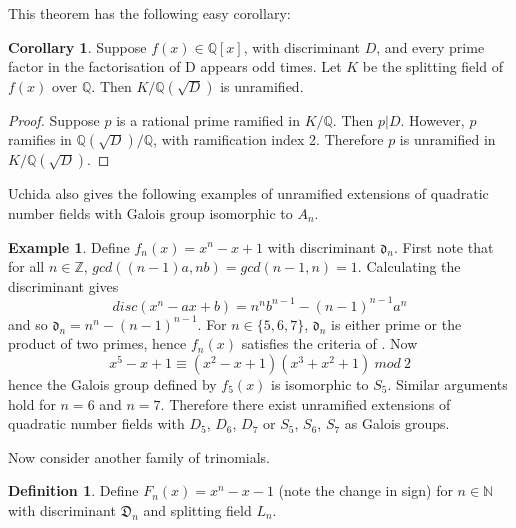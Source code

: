 \documentclass[12pt]{extarticle}
\newcommand{\N}{\mathbb{N}}
\newcommand{\Q}{\mathbb{Q}}
\newcommand{\Z}{\mathbb{Z}}
\newcommand{\<}{\langle}
\renewcommand{\>}{\rangle}
\theoremstyle{definition}
\newtheorem{corollary}{Corollary}
\newtheorem*{definition}{Definition}
\newtheorem{example}{Example}
\begin{document}
This theorem has the following easy corollary:
\begin{corollary}
Suppose $f(x) \in \Q[x]$, with discriminant $D$, and every prime factor in the factorisation of D appears odd times. Let $K$ be the splitting field of $f(x)$ over $\Q$. Then $K/\Q\left(\sqrt{D}\right)$ is unramified. \label{cor:uchida}
\end{corollary}
\begin{proof}
Suppose $p$ is a rational prime ramified in $K/\Q$. Then $p|D$. However, $p$ ramifies in $\Q(\sqrt{D})/\Q$, with ramification index 2. Therefore $p$ is unramified in $K/\Q(\sqrt{D})$. 
\end{proof}
Uchida also gives the following examples of unramified extensions of quadratic number fields with Galois group isomorphic to $A_n$.\par
\begin{example}
Define $f_n(x) = x^n-x+1$ with discriminant $\mathfrak{d}_n$. First note that for all $n \in \Z$, 
$gcd((n-1)a, nb) = gcd(n-1,n) =1 $. Calculating the discriminant gives
\begin{equation}
\label{eq:disc_trin}
disc(x^n-ax+b) = n^nb^{n-1}-(n-1)^{n-1}a^n
\end{equation}
 and so $\mathfrak{d}_n = n^n-(n-1)^{n-1}$. For $n \in \{5,6,7\}$, $\mathfrak{d}_n$ is either prime or the product of two primes, hence $f_n(x)$ satisfies the criteria of . Now 
\begin{equation}
x^5 - x+1 \equiv (x^2 - x +1)(x^3 +x^2 +1)\:mod\:2
\end{equation}
hence the Galois group defined by $f_5(x)$ is isomorphic to $S_5$. Similar arguments hold for $n=6$ and $n=7$. Therefore there exist unramified extensions of quadratic number fields with $D_5$, $D_6$, $D_7$ or $S_5$, $S_6$, $S_7$ as Galois groups. 
\end{example}


Now consider another family of trinomials.
\begin{definition}
\label{def:irred_trin}
Define $F_n(x) = x^n-x-1$ (note the change in sign) for $ n \in \N$ with discriminant $\mathfrak{D}_n$ and splitting field $L_n$.
\end{definition}
\end{document}
